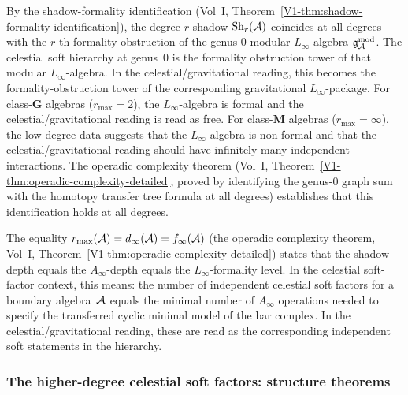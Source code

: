 \begin{remark}
By the shadow-formality identification
(Vol~I, Theorem~\ref*{V1-thm:shadow-formality-identification}),
the degree-$r$ shadow $\operatorname{Sh}_r(\mathcal{A})$ coincides at all degrees
with the $r$-th formality obstruction of the genus-$0$ modular
$L_\infty$-algebra $\mathfrak{g}_{\mathcal{A}}^{\mathrm{mod}}$. The celestial soft hierarchy at
genus~$0$ is the formality obstruction tower of that modular
$L_\infty$-algebra. In the celestial/gravitational reading, this
becomes the formality-obstruction tower of the corresponding
gravitational $L_\infty$-package. For class-$\mathbf{G}$ algebras
($r_{\max} = 2$), the $L_\infty$-algebra is formal and the
celestial/gravitational reading is read as free. For class-$\mathbf{M}$
algebras ($r_{\max} = \infty$), the low-degree data suggests that the
$L_\infty$-algebra is non-formal and that the celestial/gravitational
reading should have infinitely many independent interactions. The operadic complexity
theorem (Vol~I, Theorem~\ref*{V1-thm:operadic-complexity-detailed},
proved by identifying the genus-$0$ graph sum with the homotopy transfer tree formula
at all degrees) establishes that this identification holds at all degrees.
\end{remark}

\begin{remark}
The equality $r_{\max}(\mathcal{A}) = d_\infty(\mathcal{A}) =
f_\infty(\mathcal{A})$ (the operadic complexity theorem, Vol~I,
Theorem~\ref*{V1-thm:operadic-complexity-detailed}) states that the shadow depth equals the
$A_\infty$-depth equals the $L_\infty$-formality level. In the
celestial soft-factor context, this means: the number of independent
celestial soft factors for a boundary algebra~$\mathcal{A}$ equals the
minimal number of $A_\infty$ operations needed to specify the
transferred cyclic minimal model of the bar complex. In the
celestial/gravitational reading, these are read as the corresponding
independent soft statements in the hierarchy.
\end{remark}

\subsubsection{The higher-degree celestial soft factors: structure theorems}

